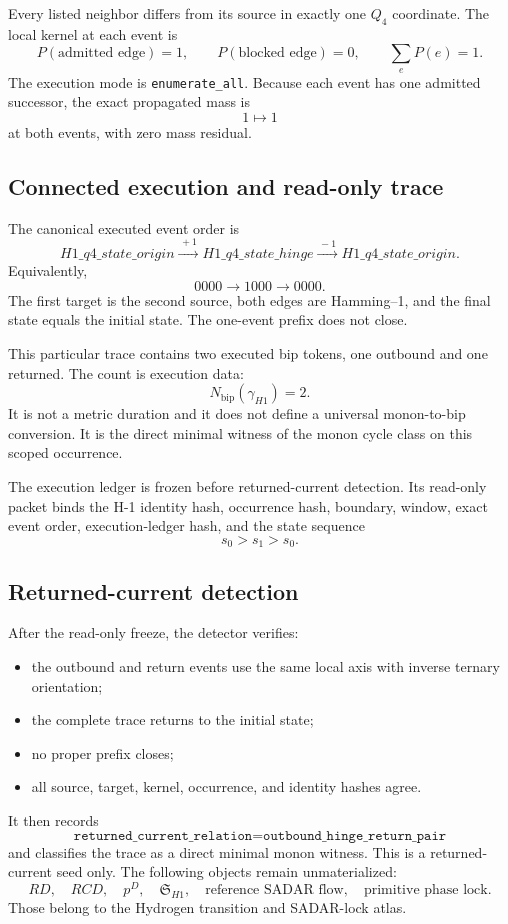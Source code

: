 Every listed neighbor differs from its source in exactly one \(Q_4\)
coordinate.  The local kernel at each event is
\[
P(\text{admitted edge})=1,
\qquad
P(\text{blocked edge})=0,
\qquad
\sum_e P(e)=1.
\]
The execution mode is \texttt{enumerate\_all}.  Because each event has one
admitted successor, the exact propagated mass is
\[
1\longmapsto 1
\]
at both events, with zero mass residual.

\subsection{Connected execution and read-only trace}

The canonical executed event order is
\[
H1\_q4\_state\_origin
\xrightarrow{\,+1\,}
H1\_q4\_state\_hinge
\xrightarrow{\,-1\,}
H1\_q4\_state\_origin.
\]
Equivalently,
\[
0000\longrightarrow1000\longrightarrow0000.
\]
The first target is the second source, both edges are Hamming--1, and the final
state equals the initial state.  The one-event prefix does not close.

This particular trace contains two executed bip tokens, one outbound and one
returned.  The count is execution data:
\[
N_{\mathrm{bip}}(\gamma_{H1})=2.
\]
It is not a metric duration and it does not define a universal monon-to-bip
conversion.  It is the direct minimal witness of the monon cycle class on this
scoped occurrence.

The execution ledger is frozen before returned-current detection.  Its
read-only packet binds the H-1 identity hash, occurrence hash, boundary,
window, exact event order, execution-ledger hash, and the state sequence
\[
s_0>s_1>s_0.
\]

\subsection{Returned-current detection}

After the read-only freeze, the detector verifies:
\begin{itemize}
  \item the outbound and return events use the same local axis with inverse
        ternary orientation;
  \item the complete trace returns to the initial state;
  \item no proper prefix closes;
  \item all source, target, kernel, occurrence, and identity hashes agree.
\end{itemize}
It then records
\[
\texttt{returned\_current\_relation}
=
\texttt{outbound\_hinge\_return\_pair}
\]
and classifies the trace as a direct minimal monon witness.  This is a
returned-current seed only.  The following objects remain unmaterialized:
\[
RD,
\quad
RCD,
\quad
p^D,
\quad
\mathfrak S_{H1},
\quad
\text{reference SADAR flow},
\quad
\text{primitive phase lock}.
\]
Those belong to the Hydrogen transition and SADAR-lock atlas.

